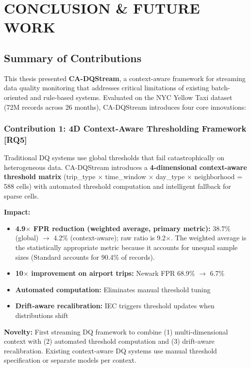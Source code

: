 \newpage
\chapter{CONCLUSION \& FUTURE WORK}
\pagestyle{fancy}

\section{Summary of Contributions}

This thesis presented \textbf{CA-DQStream}, a context-aware framework for streaming data quality monitoring that addresses critical limitations of existing batch-oriented and rule-based systems. Evaluated on the NYC Yellow Taxi dataset (72M records across 26 months), CA-DQStream introduces four core innovations:

\subsection{Contribution 1: 4D Context-Aware Thresholding Framework [RQ5]}

Traditional DQ systems use global thresholds that fail catastrophically on heterogeneous data. CA-DQStream introduces a \textbf{4-dimensional context-aware threshold matrix} (trip\_type $\times$ time\_window $\times$ day\_type $\times$ neighborhood = 588 cells) with automated threshold computation and intelligent fallback for sparse cells.

\textbf{Impact:}
\begin{itemize}
    \item \textbf{4.9$\times$ FPR reduction (weighted average, primary metric):} 38.7\% (global) $\to$ 4.2\% (context-aware); raw ratio is 9.2$\times$. The weighted average is the statistically appropriate metric because it accounts for unequal sample sizes (Standard accounts for 90.4\% of records).
    \item \textbf{10$\times$ improvement on airport trips:} Newark FPR 68.9\% $\to$ 6.7\%
    \item \textbf{Automated computation:} Eliminates manual threshold tuning
    \item \textbf{Drift-aware recalibration:} IEC triggers threshold updates when distributions shift
\end{itemize}

\textbf{Novelty:} First streaming DQ framework to combine (1) multi-dimensional context with (2) automated threshold computation and (3) drift-aware recalibration. Existing context-aware DQ systems use manual threshold specification or separate models per context.

